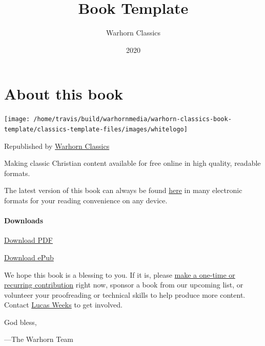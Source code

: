 \documentclass[
]{book}
\title{Book Template}
\author{Warhorn Classics}
\date{2020}
\begin{document}
\maketitle

\mainmatter
{}

{
\setcounter{tocdepth}{1}
\tableofcontents
}
\hypertarget{about-this-book}{%
\chapter*{About this book}\label{about-this-book}}

\begin{center}\texttt{[image: /home/travis/build/warhornmedia/warhorn-classics-book-template/classics-template-files/images/whitelogo]} \end{center}

Republished by \href{https://classics.warhornmedia.com/}{Warhorn Classics}

Making classic Christian content available for free online in high quality, readable formats.

The latest version of this book can always be found \href{https://warhornmedia.github.io/warhorn-classics-book-template}{here} in many electronic formats for your reading convenience on any device.

\hypertarget{downloads}{%
\subsubsection*{Downloads}\label{downloads}}

\href{https://warhornmedia.github.io/warhorn-classics-book-template/Warhorn-Classics_Book_Template.pdf}{Download PDF}

\href{https://warhornmedia.github.io/warhorn-classics-book-template/Warhorn-Classics_Book_Template.epub}{Download ePub}

We hope this book is a blessing to you. If it is, please \href{https://warhornmedia.com/give}{make a one-time or recurring contribution} right now, sponsor a book from our upcoming list, or volunteer your proofreading or technical skills to help produce more content. Contact \href{mailto:lucas@beggarsborn.com}{Lucas Weeks} to get involved.

God bless,

---The Warhorn Team

\clearpage
\setcounter{page}{1}
\end{document}
